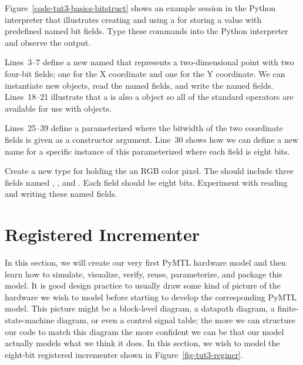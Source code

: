 \documentclass{cbxdoc}
\begin{document}
\begin{minipage}[t]{0.5\tw}
\setlength{\parskip}{0.5em}

  Figure~\ref{code-tut3-basics-bitstruct} shows an example session in the
  Python interpreter that illustrates creating and using a 
  for storing a value with predefined named bit fields. Type these
  commands into the Python interpreter and observe the output.

  Lines~3--7 define a new  named  that represents
  a two-dimensional point with two four-bit fields; one for the X
  coordinate and one for the Y coordinate. We can instantiate new
   objects, read the named fields, and write the named fields.
  Lines~18--21 illustrate that a  is also a 
  object so all of the standard  operators are available for use
  with  objects.

  Lines~25--39 define a parameterized  where the bitwidth
  of the two coordinate fields is given as a constructor argument.
  Line~30 shows how we can define a new name for a specific instance of
  this parameterized  where each field is eight bits.

  \begin{task}
    Create a new  type for holding the an RGB color pixel.
    The  should include three fields named ,
    , and . Each field should be eight bits.
    Experiment with reading and writing these named fields.
  \end{task}

\end{minipage}
\hfill
\begin{minipage}[t]{0.46\tw}
  \vspace{-0.2in}

  
\end{minipage}


\section{Registered Incrementer}
\label{sec-regincr}

In this section, we will create our very first PyMTL hardware model and
then learn how to simulate, visualize, verify, reuse, parameterize, and
package this model. It is good design practice to usually draw some kind
of picture of the hardware we wish to model before starting to develop
the corresponding PyMTL model. This picture might be a block-level
diagram, a datapath diagram, a finite-state-machine diagram, or even a
control signal table; the more we can structure our code to match this
diagram the more confident we can be that our model actually models what
we think it does. In this section, we wish to model the eight-bit
registered incrementer shown in Figure~\ref{fig-tut3-regincr}.
\end{document}
